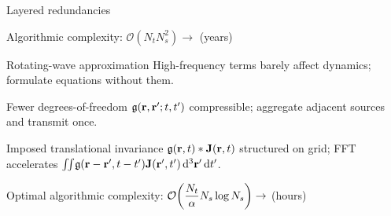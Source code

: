 \documentclass[aspectratio=169, usenames, dvipsnames]{beamer}
\begin{document}
\begin{frame}{Layered redundancies}
  \begin{center}
    Algorithmic complexity: $\displaystyle\mathcal{O}(N_t N_s^2) \to$ \alert{(years)}
  \end{center}
  \begin{block}{Rotating-wave approximation}
    High-frequency terms barely affect dynamics; formulate equations without them.
  \end{block}
  \begin{block}{Fewer degrees-of-freedom}
    $\mathfrak{g}(\vb{r}, \vb{r}'; t, t')$ compressible; aggregate adjacent sources and transmit once.
  \end{block}
  \begin{block}{Imposed translational invariance}
    $\mathfrak{g}(\vb{r}, t) * \vb{J}(\vb{r}, t)$ structured on grid; FFT accelerates $\iint_{}\mathfrak{g}(\vb{r} - \vb{r}', t - t') \vb{J}(\vb{r'}, t') \dd[3]{\vb{r}'} \dd{t'}$.
  \end{block}
  \begin{center}
    Optimal algorithmic complexity: $\displaystyle\mathcal{O}\qty(\frac{N_t}{\alpha} N_s \log N_s) \to$ \alert{(hours)}
  \end{center}
\end{frame}
\end{document}
